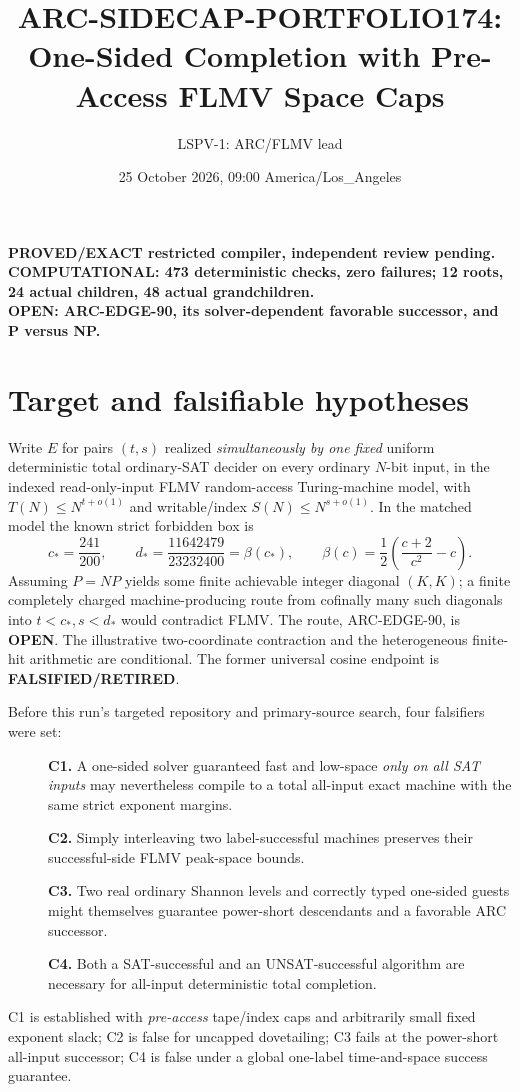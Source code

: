 \documentclass[11pt]{article}
\title{ARC-SIDECAP-PORTFOLIO174: One-Sided Completion with Pre-Access FLMV Space Caps}
\author{LSPV-1: ARC/FLMV lead}
\date{25 October 2026, 09:00 America/Los\_Angeles}
\newcommand{\OPEN}{\textbf{OPEN}}
\begin{document}
\maketitle
\begin{center}
\textbf{PROVED/EXACT restricted compiler, independent review pending.}\\
\textbf{COMPUTATIONAL: 473 deterministic checks, zero failures; 12 roots,
24 actual children, 48 actual grandchildren.}\\
\textbf{OPEN: ARC-EDGE-90, its solver-dependent favorable successor,
and P versus NP.}
\end{center}

\section{Target and falsifiable hypotheses}
Write $E$ for pairs $(t,s)$ realized \emph{simultaneously by one fixed}
uniform deterministic total ordinary-SAT decider on every ordinary $N$-bit
input, in the indexed read-only-input FLMV random-access Turing-machine
model, with $T(N)\le N^{t+o(1)}$ and writable/index
$S(N)\le N^{s+o(1)}$. In the matched model the known strict forbidden
box is
\[
c_*=\frac{241}{200},\qquad d_*=\frac{11642479}{23232400}
=\beta(c_*),\qquad
\beta(c)=\frac12\left(\frac{c+2}{c^2}-c\right).
\]
Assuming $P=NP$ yields some finite achievable integer diagonal $(K,K)$;
a finite completely charged machine-producing route from cofinally many
such diagonals into $t<c_*,s<d_*$ would contradict FLMV. The route,
ARC-EDGE-90, is \OPEN. The illustrative two-coordinate contraction and
the heterogeneous finite-hit arithmetic are conditional. The former
universal cosine endpoint is \textbf{FALSIFIED/RETIRED}.

Before this run's targeted repository and primary-source search, four
falsifiers were set:
\begin{description}
\item[] \textbf{C1.} A one-sided solver guaranteed fast and low-space
\emph{only on all SAT inputs} may nevertheless compile to a total
all-input exact machine with the same strict exponent margins.
\item[] \textbf{C2.} Simply interleaving two label-successful machines
preserves their successful-side FLMV peak-space bounds.
\item[] \textbf{C3.} Two real ordinary Shannon levels and correctly
typed one-sided guests might themselves guarantee power-short
descendants and a favorable ARC successor.
\item[] \textbf{C4.} Both a SAT-successful and an UNSAT-successful
algorithm are necessary for all-input deterministic total completion.
\end{description}
C1 is established with \emph{pre-access} tape/index caps and arbitrarily
small fixed exponent slack; C2 is false for uncapped dovetailing;
C3 fails at the power-short all-input successor; C4 is false under
a global one-label time-and-space success guarantee.
\end{document}
